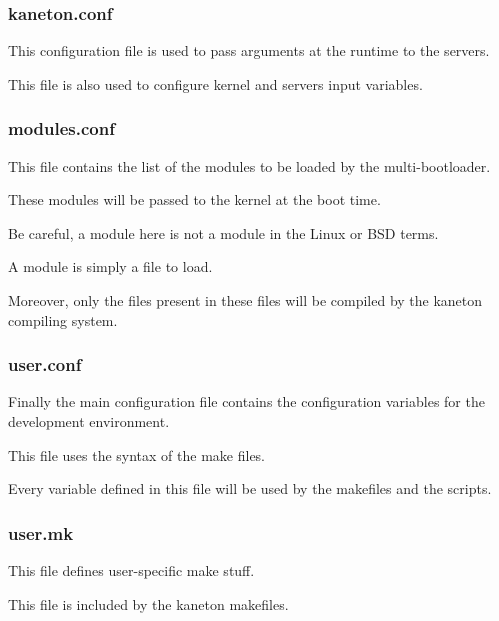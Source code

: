 
\begin{frame}
  \frametitle{kaneton.conf}

  This configuration file is used to pass arguments at the runtime to the
  servers.

  \nl

  This file is also used to configure kernel and servers input variables.
\end{frame}


\begin{frame}
  \frametitle{modules.conf}

  This file contains the list of the modules to be loaded by the
  multi-bootloader.

  \nl

  These modules will be passed to the kernel at the boot time.

  \nl

  Be careful, a module here is not a module in the Linux or BSD terms.

  \nl

  A module is simply a file to load.

  \nl

  Moreover, only the files present in these files will be compiled by
  the kaneton compiling system.
\end{frame}


\begin{frame}
  \frametitle{user.conf}

  Finally the main configuration file contains the configuration
  variables for the development environment.

  \nl

  This file uses the syntax of the make files.

  \nl

  Every variable defined in this file will be used by the makefiles
  and the scripts.
\end{frame}


\begin{frame}
  \frametitle{user.mk}

  This file defines user-specific make stuff.

  \nl

  This file is included by the kaneton makefiles.
\end{frame}

